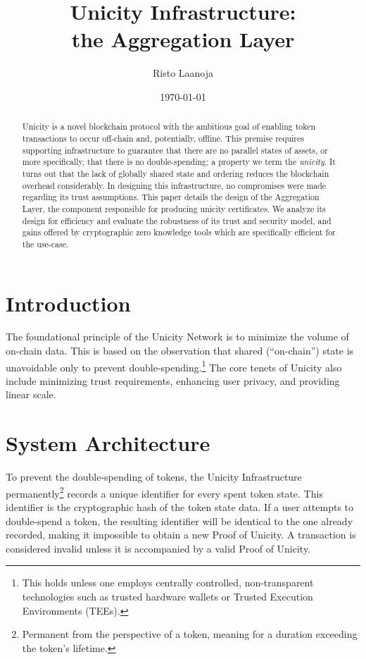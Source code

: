 \documentclass[twocolumn]{article}
\title{Unicity Infrastructure:\\
    the Aggregation Layer}
\author[1]{Risto Laanoja}
\affil[1]{Unicity Labs}
\date{\today}
\begin{document}
\maketitle

\begin{abstract}
Unicity is a novel blockchain protocol with the ambitious goal of enabling token transactions to occur off-chain and, potentially, offline. This premise requires supporting infrastructure to guarantee that there are no parallel states of assets, or more specifically, that there is no double-spending; a property we term the \textit{unicity}. It turns out that the lack of globally shared state and ordering reduces the blockchain overhead considerably. In designing this infrastructure, no compromises were made regarding its trust assumptions. This paper details the design of the Aggregation Layer, the component responsible for producing unicity certificates. We analyze its design for efficiency and evaluate the robustness of its trust and security model, and gains offered by cryptographic zero knowledge tools which are specifically efficient for the use-case.
\end{abstract}


\section{Introduction}

The foundational principle of the Unicity Network is to minimize the volume of on-chain data. This is based on the observation that shared (``on-chain'') state is unavoidable only to prevent double-spending.\footnote{This holds unless one employs centrally controlled, non-transparent technologies such as trusted hardware wallets or Trusted Execution Environments (TEEs).} The core tenets of Unicity also include minimizing trust requirements, enhancing user privacy, and providing linear scale.


\section{System Architecture}

To prevent the double-spending of tokens, the Unicity Infrastructure permanently\footnote{Permanent from the perspective of a token, meaning for a duration exceeding the token's lifetime.} records a unique identifier for every spent token state. This identifier is the cryptographic hash of the token state data. If a user attempts to double-spend a token, the resulting identifier will be identical to the one already recorded, making it impossible to obtain a new Proof of Unicity. A transaction is considered invalid unless it is accompanied by a valid Proof of Unicity.
\end{document}
